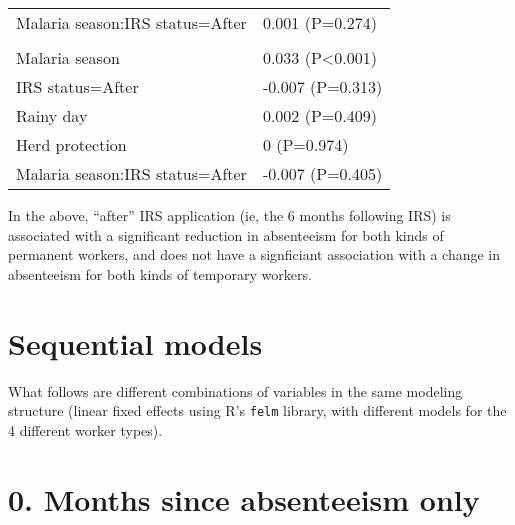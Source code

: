 \documentclass[]{article}
\begin{document}
\begin{longtable}[t]{ll}
\hspace{1em}Malaria season:IRS status=After & 0.001 (P=0.274)\\
\addlinespace[1.5em]
\multicolumn{2}{l}{\textbf{Temporary not field worker}}\\
\hspace{1em}Malaria season & 0.033 (P<0.001)\\
\hspace{1em}IRS status=After & -0.007 (P=0.313)\\
\hspace{1em}Rainy day & 0.002 (P=0.409)\\
\hspace{1em}Herd protection & 0 (P=0.974)\\
\hspace{1em}Malaria season:IRS status=After & -0.007 (P=0.405)\\*
\end{longtable}

In the above, ``after'' IRS application (ie, the 6 months following IRS)
is associated with a significant reduction in absenteeism for both kinds
of permanent workers, and does not have a signficiant association with a
change in absenteeism for both kinds of temporary workers.

\section{Sequential models}\label{sequential-models}

What follows are different combinations of variables in the same
modeling structure (linear fixed effects using R's \texttt{felm}
library, with different models for the 4 different worker types).

\section{0. Months since absenteeism
only}\label{months-since-absenteeism-only}
\end{document}
